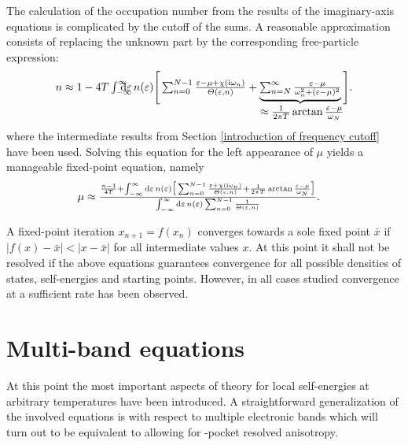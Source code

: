 The calculation of the occupation number from the results of the imaginary-axis
 equations is complicated by the cutoff of the 
sums. A reasonable approximation consists of replacing the unknown part by the
corresponding free-particle expression:
%
\begin{equation*}
    n \approx 1 - 4 T \int \from{-\infty} \till \infty \D \epsilon \,
    n(\epsilon)
    \Bigg[
        \sum_{n = 0}^{N - 1}
        \frac{\epsilon - \mu + \chi(\I \omega_n)}{\Theta(\epsilon, n)}
        + \hypo { \sum_{n = N}^\infty
            \frac{\epsilon - \mu}{\omega_n^2 + (\epsilon - \mu)^2} }
            {\approx \frac 1 {2 \pi T} \arctan \frac{\epsilon - \mu}{\omega_N}}
    \Bigg].
\end{equation*}
%
where the intermediate results from Section \ref{introduction of frequency
cutoff} have been used. Solving this equation for the left appearance of $\mu$
yields a manageable fixed-point equation, namely
%
\begin{align*}
    \mu &\approx \frac
    {
        \frac{n - 1}{4 T} + \int_{-\infty}^\infty \D \epsilon \, n(\epsilon)
        \big[
            \sum_{n = 0}^{N - 1}
            \frac{\epsilon + \chi(\I \omega_n)}{\Theta(\epsilon, n)}
            + \frac 1 {2 \pi T} \arctan \frac{\epsilon - \mu}{\omega_N}
        \big]
    }
    {
        \int_{-\infty}^\infty \D \epsilon \, n(\epsilon)
        \sum_{n = 0}^{N - 1} \frac 1 {\Theta(\epsilon, n)}
    }.
\end{align*}

A fixed-point iteration $x_{n + 1} = f(x_n)$ converges towards a sole fixed
point $\bar x$ if $|f(x) - \bar x| < |x - \bar x|$ for all intermediate values
$x$. At this point it shall not be resolved if the above equations guarantees
convergence for all possible densities of states, self-energies and starting
points. However, in all cases studied convergence at a sufficient rate has been
observed.

\section{Multi-band  equations}

At this point the most important aspects of  theory for local
self-energies at arbitrary temperatures have been introduced. A straightforward
generalization of the involved equations is with respect to multiple electronic
bands which will turn out to be equivalent to allowing for -pocket
resolved anisotropy.

